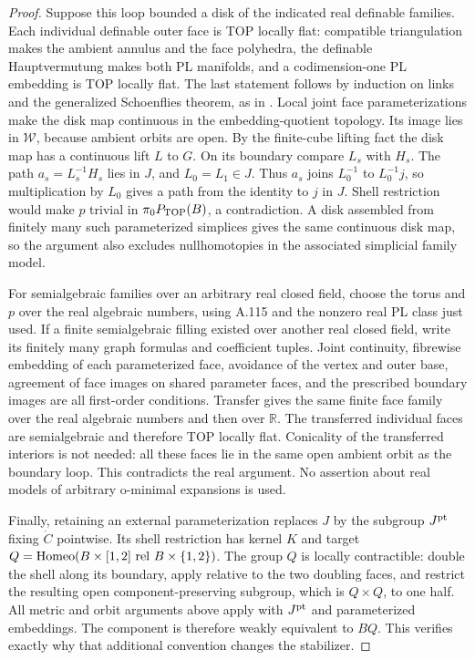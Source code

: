 \begin{proof}
Suppose this loop bounded a disk of the indicated real definable
families. Each individual definable outer face is TOP locally flat:
compatible triangulation makes the ambient annulus and the face
polyhedra, the definable Hauptvermutung makes both PL manifolds, and
a codimension-one PL embedding is TOP locally flat. The last statement
follows by induction on links and the generalized Schoenflies theorem,
as in \cite[Theorem~1.2.1, p.~29]{DavermanVenema2009}.
Local joint face parameterizations make the disk map continuous in the
embedding-quotient topology. Its image lies in $\mathcal W$, because
ambient orbits are open. By the finite-cube lifting fact the disk map
has a continuous lift $L$ to $G$. On its boundary compare $L_s$ with
$H_s$. The path $a_s=L_s^{-1}H_s$ lies in $J$, and $L_0=L_1\in J$.
Thus $a_s$ joins $L_0^{-1}$ to $L_0^{-1}j$, so multiplication by $L_0$
gives a path from the identity to $j$ in $J$. Shell restriction would
make $p$ trivial in $\pi_0P_{\rm TOP}(B)$, a contradiction. A disk
assembled from finitely many such parameterized simplices gives the
same continuous disk map, so the argument also excludes nullhomotopies
in the associated simplicial family model.

For semialgebraic families over an arbitrary real closed field, choose
the torus and $p$ over the real algebraic numbers, using A.115 and the
nonzero real PL class just used. If a finite semialgebraic filling
existed over another real closed field, write its finitely many graph
formulas and coefficient tuples. Joint continuity, fibrewise embedding
of each parameterized face, avoidance of the vertex and outer base,
agreement of face images on shared parameter faces, and the prescribed
boundary images are all first-order conditions. Transfer gives the
same finite face family over the real algebraic numbers and then over
$\mathbb R$. The transferred individual faces are semialgebraic and
therefore TOP locally flat. Conicality of the transferred interiors is
not needed: all these faces lie in the same open ambient orbit as the
boundary loop. This contradicts the real argument. No assertion about
real models of arbitrary o-minimal expansions is used.

Finally, retaining an external parameterization replaces $J$ by the
subgroup $J^{\rm pt}$ fixing $\dot C$ pointwise. Its shell restriction
has kernel $K$ and target
$Q=\Homeo(B\times[1,2]\ \mathrm{rel}\ B\times\{1,2\})$.
The group $Q$ is locally contractible: double the shell along its
boundary, apply \cite[Corollary~7.3, p.~83]{EdwardsKirby1971} relative
to the two doubling faces, and restrict the resulting open
component-preserving subgroup, which is $Q\times Q$, to one half.
All metric and orbit arguments above apply with $J^{\rm pt}$ and
parameterized embeddings. The component is therefore weakly equivalent
to $BQ$. This verifies exactly why that additional convention changes
the stabilizer.
\end{proof}

